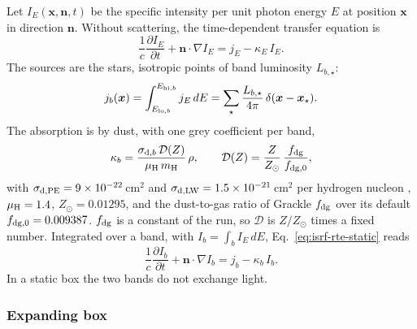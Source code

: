 Let $I_E(\boldsymbol{x},\boldsymbol{n},t)$ be the specific intensity per unit
photon energy $E$ at position $\boldsymbol{x}$ in direction $\boldsymbol{n}$.
Without scattering, the time-dependent transfer equation is
\citep{MihalasMihalas1984}
\begin{equation}
  \frac{1}{c}\frac{\partial I_E}{\partial t}
  + \boldsymbol{n}\cdot\nabla I_E
  = j_E - \kappa_E\,I_E .
  \label{eq:isrf-rte-static}
\end{equation}
The sources are the stars, isotropic points of band luminosity $L_{b,\star}$:
\begin{equation}
  j_b(\boldsymbol{x}) = \int_{E_{{\rm lo},b}}^{E_{{\rm hi},b}} j_E\,dE
  = \sum_\star \frac{L_{b,\star}}{4\pi}\,
    \delta(\boldsymbol{x}-\boldsymbol{x}_\star).
  \label{eq:isrf-source}
\end{equation}
The absorption is by dust, with one grey coefficient per band,
\begin{equation}
  \kappa_b = \frac{\sigma_{{\rm d},b}\,\mathcal{D}(Z)}{\mu_{\rm H}\,m_{\rm H}}\,\rho,
  \qquad
  \mathcal{D}(Z) = \frac{Z}{Z_\odot}\,\frac{f_{\rm dg}}{f_{\rm dg,0}},
  \label{eq:isrf-kappa}
\end{equation}
with $\sigma_{{\rm d},{\rm PE}}=9\times10^{-22}$\,cm$^2$ and
$\sigma_{{\rm d},{\rm LW}}=1.5\times10^{-21}$\,cm$^2$ per hydrogen nucleon
\citep{WeingartnerDraine2001,Kim2023}, $\mu_{\rm H}=1.4$,
$Z_\odot=0.01295$, and the dust-to-gas ratio of Grackle $f_{\rm dg}$ over its
default $f_{{\rm dg},0}=0.009387$. $f_{\rm dg}$ is a constant of the run, so
$\mathcal D$ is $Z/Z_\odot$ times a fixed number. Integrated over a band, with
$I_b=\int_b I_E\,dE$, Eq.~\eqref{eq:isrf-rte-static} reads
\begin{equation}
  \frac{1}{c}\frac{\partial I_b}{\partial t}
  + \boldsymbol{n}\cdot\nabla I_b
  = j_b - \kappa_b\,I_b .
  \label{eq:isrf-rte-band}
\end{equation}
In a static box the two bands do not exchange light.

\subsubsection{Expanding box}
\label{sec:isrf-rte-comoving}

